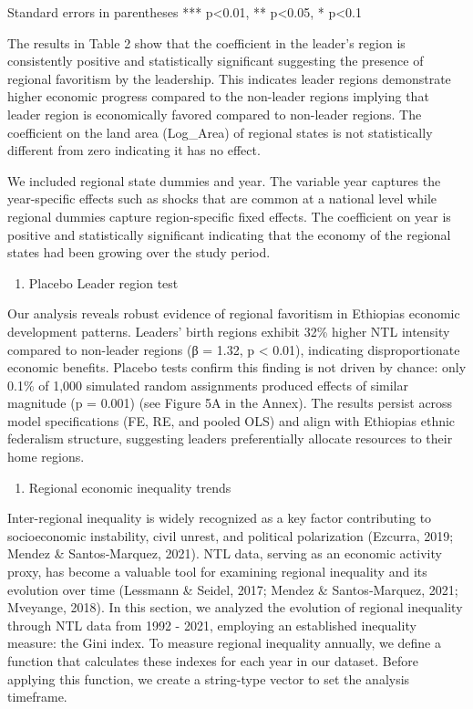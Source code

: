 Standard errors in parentheses *** p\textless0.01, ** p\textless0.05, *
p\textless0.1

The results in Table 2 show that the coefficient in the leader's region
is consistently positive and statistically significant suggesting the
presence of regional favoritism by the leadership. This indicates leader
regions demonstrate higher economic progress compared to the non-leader
regions implying that leader region is economically favored compared to
non-leader regions. The coefficient on the land area (Log\_Area) of
regional states is not statistically different from zero indicating it
has no effect.

We included regional state dummies and year. The variable year captures
the year-specific effects such as shocks that are common at a national
level while regional dummies capture region-specific fixed effects. The
coefficient on year is positive and statistically significant indicating
that the economy of the regional states had been growing over the study
period.

\begin{enumerate}
\def\labelenumi{\arabic{enumi}.}
\setcounter{enumi}{2}
\item
  Placebo Leader region test
\end{enumerate}

Our analysis reveals robust evidence of regional favoritism in
Ethiopia\textquotesingle s economic development patterns. Leaders' birth
regions exhibit 32\% higher NTL intensity compared to non-leader regions
(β = 1.32, p \textless{} 0.01), indicating disproportionate economic
benefits. Placebo tests confirm this finding is not driven by chance:
only 0.1\% of 1,000 simulated random assignments produced effects of
similar magnitude (p = 0.001) (see Figure 5A in the Annex). The results
persist across model specifications (FE, RE, and pooled OLS) and align
with Ethiopia\textquotesingle s ethnic federalism structure, suggesting
leaders preferentially allocate resources to their home regions.

\begin{enumerate}
\def\labelenumi{\arabic{enumi}.}
\setcounter{enumi}{3}
\item
  Regional economic inequality trends
\end{enumerate}

Inter-regional inequality is widely recognized as a key factor
contributing to socioeconomic instability, civil unrest, and political
polarization (Ezcurra, 2019; Mendez \& Santos‐Marquez, 2021). NTL data,
serving as an economic activity proxy, has become a valuable tool for
examining regional inequality and its evolution over time (Lessmann \&
Seidel, 2017; Mendez \& Santos‐Marquez, 2021; Mveyange, 2018). In this
section, we analyzed the evolution of regional inequality through NTL
data from 1992 - 2021, employing an established inequality measure: the
Gini index. To measure regional inequality annually, we define a
function that calculates these indexes for each year in our dataset.
Before applying this function, we create a string-type vector to set the
analysis timeframe.

